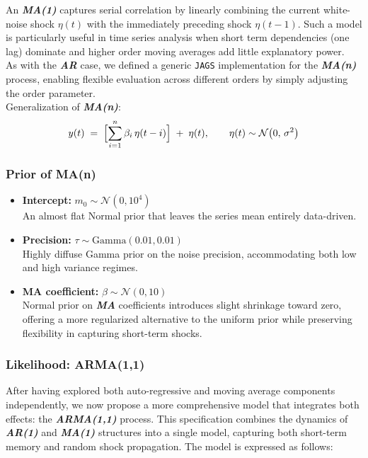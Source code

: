 \documentclass{Configuration_Files/PoliMi3i_thesis}
\begin{document}
An \textbf{\textit{MA(1)}} captures serial correlation by linearly combining the current white-noise shock \(\eta(t)\) with the immediately preceding shock \(\eta(t-1)\).  
Such a model is particularly useful in time series analysis when short term dependencies (one lag) dominate and higher order moving averages add little explanatory power.\\
As with the \textbf{\textit{AR}} case, we defined a generic \texttt{JAGS} implementation for the \textbf{\textit{MA(n)}} process, enabling flexible evaluation across different orders by simply adjusting the order parameter.\\
Generalization of \textbf{\textit{MA(n)}}:
\[
y(t) \;=\; \Bigl[\sum_{i=1}^{n} \beta_{i}\,\eta(t - i)\Bigr]\;+\;\eta(t),
\qquad \eta(t) \sim \mathcal{N}\bigl(0,\,\sigma^{2}\bigr)
\]

\subsubsection{Prior of MA(n)}
\begin{itemize}
    \item \textbf{Intercept:} $m_0 \sim \mathcal{N}(0,10^4)$\\
    An almost flat Normal prior that leaves the series mean entirely data-driven.
    \item \textbf{Precision:} $\tau \sim \mathrm{Gamma}(0.01,0.01)$\\
    Highly diffuse Gamma prior on the noise precision, accommodating both low and high variance regimes.
    \item \textbf{MA coefficient:} $
\beta \sim \mathcal{N}\left(0, 10 \right)
$\\
Normal prior on \textbf{\textit{MA}} coefficients introduces slight shrinkage toward zero, offering a more regularized alternative to the uniform prior while preserving flexibility in capturing short-term shocks.

\end{itemize}


\subsubsection{Likelihood: ARMA(1,1)}
After having explored both auto-regressive and moving average components independently, we now propose a more comprehensive model that integrates both effects: the \textbf{\textit{ARMA(1,1)}} process. This specification combines the dynamics of \textbf{\textit{AR(1)}} and \textbf{\textit{MA(1)}} structures into a single model, capturing both short-term memory and random shock propagation. The model is expressed as follows:
\end{document}
